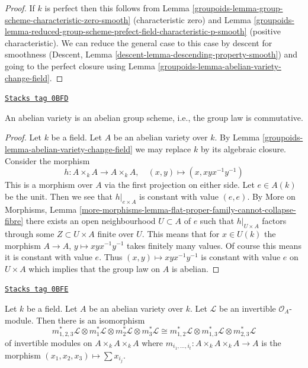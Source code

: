 \begin{proof}

If $k$ is perfect then this follows from
Lemma \ref{groupoids-lemma-group-scheme-characteristic-zero-smooth}
(characteristic zero) and
Lemma \ref{groupoids-lemma-reduced-group-scheme-prefect-field-characteristic-p-smooth}
(positive characteristic).
We can reduce the general case to this case by descent for smoothness
(Descent, Lemma \ref{descent-lemma-descending-property-smooth})
and going to the perfect closure using
Lemma \ref{groupoids-lemma-abelian-variety-change-field}.
\end{proof}

\begin{lemma}
\label{groupoids-lemma-abelian-variety-abelian}
\href{https://stacks.math.columbia.edu/tag/0BFD}{\texttt{Stacks tag 0BFD}}

An abelian variety is an abelian group scheme, i.e., the group
law is commutative.
\end{lemma}

\begin{proof}

Let $k$ be a field. Let $A$ be an abelian variety over $k$.
By Lemma \ref{groupoids-lemma-abelian-variety-change-field} we may replace
$k$ by its algebraic closure. Consider the morphism
$$
h : A \times_k A \longrightarrow A \times_k A,\quad
(x, y) \longmapsto (x, xyx^{-1}y^{-1})
$$
This is a morphism over $A$ via the first projection on either side.
Let $e \in A(k)$ be the unit. Then we see that $h|_{e \times A}$ is
constant with value $(e, e)$. By More on Morphisms, Lemma
\ref{more-morphisms-lemma-flat-proper-family-cannot-collapse-fibre}
there exists an open neighbourhood $U \subset A$ of $e$
such that $h|_{U \times A}$ factors through some $Z \subset U \times A$
finite over $U$. This means that for $x \in U(k)$ the morphism
$A \to A$, $y \mapsto xyx^{-1}y^{-1}$ takes finitely many values.
Of course this means it is constant with value $e$. Thus
$(x, y) \mapsto xyx^{-1}y^{-1}$ is
constant with value $e$ on $U \times A$ which implies
that the group law on $A$ is abelian.
\end{proof}

\begin{lemma}
\label{groupoids-lemma-apply-cube}
\href{https://stacks.math.columbia.edu/tag/0BFE}{\texttt{Stacks tag 0BFE}}

Let $k$ be a field. Let $A$ be an abelian variety over $k$.
Let $\mathcal{L}$ be an invertible $\mathcal{O}_A$-module.
Then there is an isomorphism
$$
m_{1, 2, 3}^*\mathcal{L} \otimes
m_1^*\mathcal{L} \otimes
m_2^*\mathcal{L} \otimes
m_3^*\mathcal{L} \cong
m_{1, 2}^*\mathcal{L} \otimes
m_{1, 3}^*\mathcal{L} \otimes
m_{2, 3}^*\mathcal{L}
$$
of invertible modules on $A \times_k A \times_k A$
where $m_{i_1, \ldots, i_t} : A \times_k A \times_k A \to A$
is the morphism $(x_1, x_2, x_3) \mapsto \sum x_{i_j}$.
\end{lemma}

